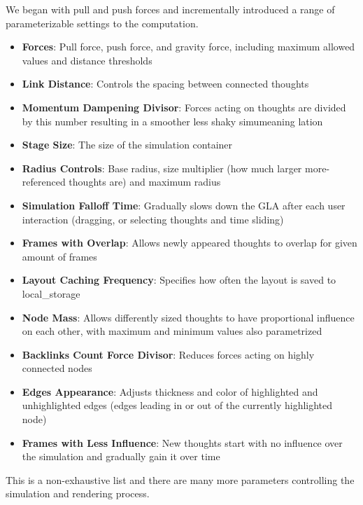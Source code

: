 We began with pull and push forces and incrementally introduced a range of parameterizable settings to the computation.
\begin{itemize}
\item \textbf{Forces}: Pull force, push force, and gravity force, including maximum allowed values and distance thresholds
\item \textbf{Link Distance}: Controls the spacing between connected thoughts
\item \textbf{Momentum Dampening Divisor}: Forces acting on thoughts are divided by this number resulting in a smoother less shaky simumeaning lation
\item \textbf{Stage Size}: The size of the simulation container
\item \textbf{Radius Controls}: Base radius, size multiplier (how much larger more-referenced thoughts are) and maximum radius
\item \textbf{Simulation Falloff Time}: Gradually slows down the \gls{GLA} after each user interaction (dragging, or selecting thoughts and time sliding)
\item \textbf{Frames with Overlap}: Allows newly appeared thoughts to overlap for given amount of frames
\item \textbf{Layout Caching Frequency}: Specifies how often the layout is saved to \gls{local_storage}
\item \textbf{Node Mass}: Allows differently sized thoughts to have proportional influence on each other, with maximum and minimum values also parametrized
\item \textbf{Backlinks Count Force Divisor}: Reduces forces acting on highly connected nodes
\item \textbf{Edges Appearance}: Adjusts thickness and color of highlighted and unhighlighted edges (edges leading in or out of the currently highlighted node)
\item \textbf{Frames with Less Influence}: New thoughts start with no influence over the simulation and gradually gain it over time
\end{itemize}

This is a non-exhaustive list and there are many more parameters controlling the simulation and rendering process.

